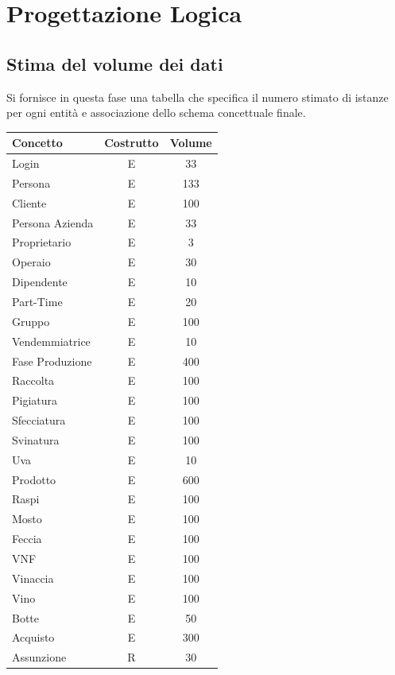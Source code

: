 \documentclass{article}
\begin{document}
\section{Progettazione Logica}
\subsection{Stima del volume dei dati}
Si fornisce in questa fase una tabella che specifica il numero stimato di istanze per ogni entità e associazione dello schema concettuale finale.\
\newline
\newline
\begin{tabular}{p{} c c}\hline
    \textbf{Concetto} & \textbf{Costrutto}   & \textbf{Volume } \\\hline
    Login& E & 33\\\hline
    Persona &E& 133\\\hline
    Cliente & E & 100\\\hline
    Persona Azienda &E&33\\\hline
    Proprietario& E & 3\\\hline
    Operaio& E & 30\\\hline
    Dipendente& E & 10  \\\hline
    Part-Time& E & 20 \\\hline
    Gruppo& E & 100\\\hline
    Vendemmiatrice& E & 10\\\hline
    Fase Produzione & E & 400\\\hline
    Raccolta & E & 100\\\hline
    Pigiatura & E & 100\\\hline
    Sfecciatura & E & 100 \\\hline
    Svinatura & E &  100\\\hline
    Uva & E & 10\\\hline
    Prodotto & E & 600\\\hline
    Raspi & E & 100\\\hline
    Mosto& E & 100\\\hline
    Feccia& E & 100\\\hline
    VNF& E & 100\\\hline
    Vinaccia& E &100 \\\hline
    Vino & E & 100\\\hline
    Botte & E & 50\\\hline
    Acquisto & E & 300\\\hline
    Assunzione & R & 30\\\hline

\end{tabular}
\end{document}
